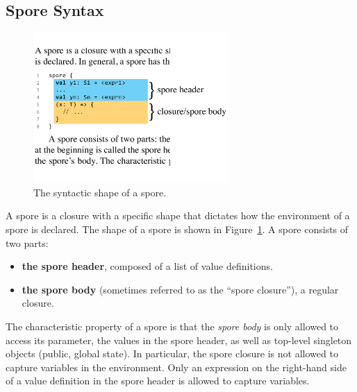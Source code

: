 \documentclass[runningheads]{llncs}
\begin{document}
\begin{sloppypar}
\subsection{Spore Syntax}
\label{sec:spore-syntax}

\setlength{\belowcaptionskip}{-6pt}
\begin{figure}[t!]
\centering
\includegraphics[width=7.4cm]{spore-shape.pdf}
\caption{The syntactic shape of a spore.}
\label{fig:spore-shape}
\vspace{-5mm}
\end{figure}
\setlength{\belowcaptionskip}{0pt}

A spore is a closure with a specific shape that dictates how the environment
of a spore is declared. The shape of a spore is shown in Figure~\ref{fig:spore-shape}.
A spore consists of two parts:
\begin{itemize}
\item {\bf the spore header}, composed of a list of value definitions.
\item {\bf the spore body} (sometimes referred to as the ``spore closure''), a regular closure.
\end{itemize}


The characteristic property
of a spore is that the {\em spore body} is only allowed to access its
parameter, the values in the spore header, as well as top-level singleton objects
(public, global state). In particular, the spore closure is not allowed to
capture variables in the environment. Only an expression on the right-hand
side of a value definition in the spore header is allowed to capture
variables.


\end{sloppypar}
\end{document}
